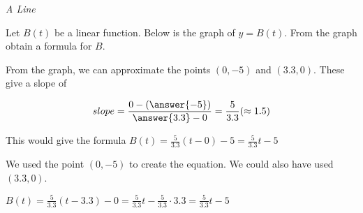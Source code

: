 \documentclass{ximera}
\begin{document}
\begin{example} \textit{A Line}


Let $B(t)$ be a linear function.    Below is the graph of $y = B(t)$. From the graph obtain a formula for $B$.


\begin{image}
\end{image}

\begin{explanation}

From the graph, we can approximate the points $(0, -5)$ and $(3.3, 0)$.  These give a slope of

\[  slope = \frac{0 - \left(\answer{-5}\right)}{\answer{3.3} - 0} = \frac{5}{3.3} (\approx 1.5)     \]


This would give the formula $B(t) = \frac{5}{3.3} (t - 0) - 5 = \frac{5}{3.3} t - 5$

\end{explanation}

\end{example}


We used the point $(0, -5)$ to create the equation.  We could also have used $(3.3,0)$.



$B(t) = \frac{5}{3.3} (t - 3.3) - 0 = \frac{5}{3.3} t - \frac{5}{3.3}\cdot 3.3 = \frac{5}{3.3} t -  5$ \\
\end{document}
